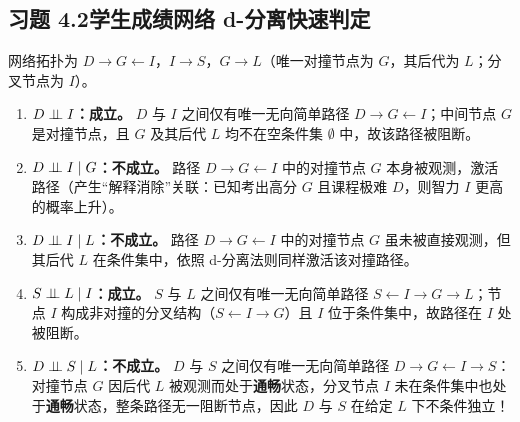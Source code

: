 \subsection*{习题 4.2\quad 学生成绩网络 d-分离快速判定}
网络拓扑为 $D \to G \leftarrow I$，$I \to S$，$G \to L$（唯一对撞节点为 $G$，其后代为 $L$；分叉节点为 $I$）。
\begin{enumerate}[label=(\arabic*), leftmargin=1.8em]
  \item \textbf{$D \perp\!\!\!\perp I$：成立。} $D$ 与 $I$ 之间仅有唯一无向简单路径 $D \to G \leftarrow I$；中间节点 $G$ 是对撞节点，且 $G$ 及其后代 $L$ 均不在空条件集 $\emptyset$ 中，故该路径被阻断。
  \item \textbf{$D \perp\!\!\!\perp I \mid G$：不成立。} 路径 $D \to G \leftarrow I$ 中的对撞节点 $G$ 本身被观测，激活路径（产生“解释消除”关联：已知考出高分 $G$ 且课程极难 $D$，则智力 $I$ 更高的概率上升）。
  \item \textbf{$D \perp\!\!\!\perp I \mid L$：不成立。} 路径 $D \to G \leftarrow I$ 中的对撞节点 $G$ 虽未被直接观测，但其后代 $L$ 在条件集中，依照 d-分离法则同样激活该对撞路径。
  \item \textbf{$S \perp\!\!\!\perp L \mid I$：成立。} $S$ 与 $L$ 之间仅有唯一无向简单路径 $S \leftarrow I \to G \to L$；节点 $I$ 构成非对撞的分叉结构（$S \leftarrow I \to G$）且 $I$ 位于条件集中，故路径在 $I$ 处被阻断。
  \item \textbf{$D \perp\!\!\!\perp S \mid L$：不成立。} $D$ 与 $S$ 之间仅有唯一无向简单路径 $D \to G \leftarrow I \to S$：对撞节点 $G$ 因后代 $L$ 被观测而处于\textbf{通畅}状态，分叉节点 $I$ 未在条件集中也处于\textbf{通畅}状态，整条路径无一阻断节点，因此 $D$ 与 $S$ 在给定 $L$ 下不条件独立！
\end{enumerate}

